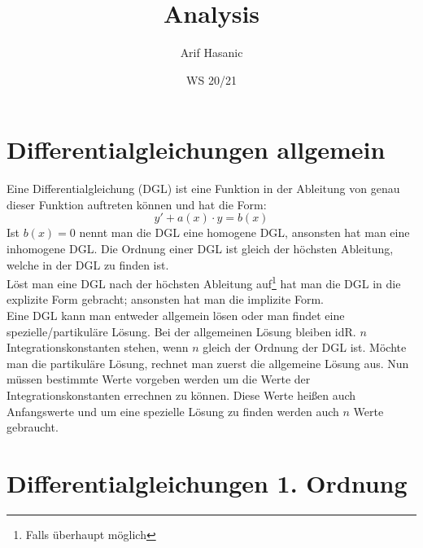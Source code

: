 \documentclass[a4paper,10pt]{scrartcl}
\title{Analysis}
\date{WS 20/21}
\author{Arif Hasanic}
\begin{document}
    \maketitle
    \afterpage{\null\newpage}
    \newpage
    \tableofcontents
    \newpage

    \section{Differentialgleichungen allgemein}
        Eine Differentialgleichung (DGL) ist eine Funktion in der Ableitung von genau dieser Funktion auftreten können und hat die Form: 
        \begin{equation}
            y' + a(x) \cdot y = b(x) 
        \end{equation}
        Ist \(b(x) = 0\) nennt man die DGL eine homogene DGL, ansonsten hat man eine inhomogene DGL. Die Ordnung einer DGL ist gleich der höchsten Ableitung,
        welche in der DGL zu finden ist. \\
        Löst man eine DGL nach der höchsten Ableitung auf\footnote{Falls überhaupt möglich} hat man die DGL in die explizite Form gebracht; ansonsten hat
        man die implizite Form. \\
        Eine DGL kann man entweder allgemein lösen oder man findet eine spezielle/partikuläre Lösung. Bei der allgemeinen Lösung bleiben idR. \(n\) Integrationskonstanten
        stehen, wenn \(n\) gleich der Ordnung der DGL ist. Möchte man die partikuläre Lösung, rechnet man zuerst die allgemeine Lösung aus. Nun müssen bestimmte Werte 
        vorgeben werden um die Werte der Integrationskonstanten errechnen zu können. Diese Werte heißen auch Anfangswerte und um eine spezielle Lösung zu finden werden
        auch \(n\) Werte gebraucht. 

    \section{Differentialgleichungen 1. Ordnung}
\end{document}

